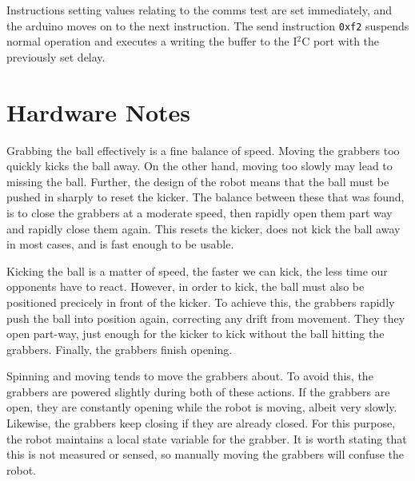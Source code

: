 \documentclass[a4paper]{scrartcl}
\begin{document}
Instructions setting values relating to the comms test are set immediately,
and the arduino moves on to the next instruction. The send instruction
\texttt{0xf2} suspends normal operation and executes a writing the buffer to
the I$^2$C port with the previously set delay.

\section{Hardware Notes}

Grabbing the ball effectively is a fine balance of speed. Moving the grabbers
too quickly kicks the ball away. On the other hand, moving too slowly may lead
to missing the ball. Further, the design of the robot means that the ball must
be pushed in sharply to reset the kicker. The balance between these that was
found, is to close the grabbers at a moderate speed, then rapidly open them
part way and rapidly close them again. This resets the kicker, does not kick the ball away in most cases, and is fast enough to be usable.

Kicking the ball is a matter of speed, the faster we can kick, the less time
our opponents have to react. However, in order to kick, the ball must also be
positioned precicely in front of the kicker. To achieve this, the grabbers
rapidly push the ball into position again, correcting any drift from movement.
They they open part-way, just enough for the kicker to kick without the ball
hitting the grabbers. Finally, the grabbers finish opening.

Spinning and moving tends to move the grabbers about. To avoid this, the
grabbers are powered slightly during both of these actions. If the grabbers are
open, they are constantly opening while the robot is moving, albeit very
slowly. Likewise, the grabbers keep closing if they are already closed. For
this purpose, the robot maintains a local state variable for the grabber. It is
worth stating that this is not measured or sensed, so manually moving the
grabbers will confuse the robot.
\end{document}
